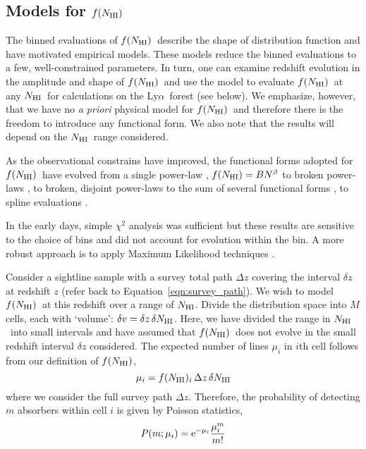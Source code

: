 \documentclass[graybox]{svmult}
\def\lya{Ly$\alpha$}
\newcommand{\mnhi}{N_{\rm HI}}
\newcommand{\nhi}{$\mnhi$}
\def\mfnhi{f(\mnhi)}
\def\fnhi{$\mfnhi$}
\begin{document}
\subsection{Models for \fnhi}

The binned evaluations of \fnhi\ describe the shape of 
distribution function and have motivated empirical
models. These models reduce the binned evaluations to a few, 
well-constrained parameters.  In turn, one can
examine redshift evolution in the amplitude and shape
of \fnhi\ and use the model to evaluate \fnhi\ at 
any \nhi\ for calculations on the \lya\ forest (see below).
We emphasize, however, that we have no {\it a priori}
physical model for \fnhi\ and therefore there is the
freedom to introduce any functional form.
We also note that the results will depend
on the \nhi\ range considered. 

As the observational constrains have improved, the
functional forms adopted for \fnhi\ have evolved from
a single power-law \cite{tytler87},
$\mfnhi = B N^\beta$
to broken power-laws \cite{petit93,pow10},
to broken, disjoint power-laws \cite{rudie13} 
to the sum of several functional forms \cite{inoue+14},
to spline evaluations \cite{pro+14}.

In the early days, simple $\chi^2$ analysis
was sufficient but these results
are sensitive to the choice of bins and did
not account for evolution within the bin.
A more robust approach is to apply Maximum
Likelihood techniques \cite{sim96,ctp+10}.

Consider a sightline sample with a survey total path $\Delta z$ 
covering the interval $\delta z$ at redshift $z$ (refer
back to Equation~\ref{eqn:survey_path}).
We wish to model \fnhi\ at this redshift over a
range of \nhi.  
Divide the distribution space into $M$ cells, each with 
`volume': $\delta v = \delta z \, \delta \mnhi$.
Here, we have divided the range in \nhi\ into small intervals
and have assumed that \fnhi\ does not evolve in the small
redshift interval $\delta z$ considered.
The expected number of lines $\mu_i$ in $i$th cell
follows from our definition of \fnhi, 
\begin{equation}
\mu_i = f(\mnhi)_i \, \Delta z \, \delta\mnhi
\end{equation}
where we consider the full survey path $\Delta z$.
Therefore, the probability of detecting $m$ absorbers within 
cell $i$ is given by Poisson statistics,
\begin{equation}
P(m; \mu_i) = {\rm e}^{-\mu_i} \frac{\mu_i^m}{m!}
\end{equation}
\end{document}
